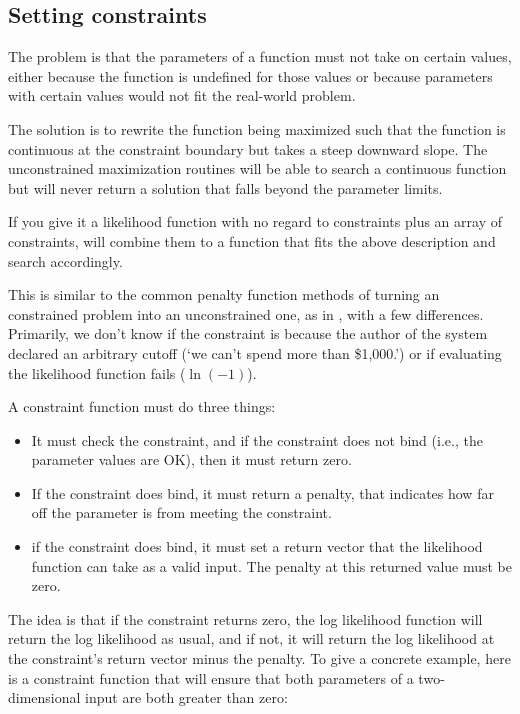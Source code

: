 \subsection{Setting constraints}

The problem is that the parameters of a function must not take on
certain values, either because the function is undefined for those
values or because parameters with certain values would not fit the
real-world problem.

The solution is to rewrite the function being maximized such that the
function is continuous at the constraint boundary but takes a steep
downward slope. The unconstrained maximization routines will be able
to search a continuous function but will never return a solution that
falls beyond the parameter limits.

If you give it a likelihood function with no regard to constraints plus
an array of constraints,  will combine
them to a function that fits the above description and search accordingly.

This is similar to the common penalty function methods of turning an
constrained problem into an unconstrained one, as in \cite{avriel:nonlinear},
with a few differences. Primarily, we don't know if the constraint is
because the author of the system declared an arbitrary cutoff (`we can't spend more
than \$1,000.') or if evaluating the likelihood function fails
($\ln(-1)$). 

A constraint function must do three things:
\begin{itemize}
\item It must check the constraint, and if the constraint does not bind (i.e., the parameter values are OK), then it must return zero.
\item If the constraint does bind, it must return a penalty, that indicates how far off the parameter is from meeting the constraint.
\item if the constraint does bind, it must set a return vector that the likelihood function can take as a valid input. The penalty at this returned value must be zero.
\end{itemize}

The idea is that if the constraint returns zero, the log likelihood
function will return the log likelihood as usual, and if not, it will
return the log likelihood at the constraint's return vector minus the
penalty. To give a concrete example, here is a constraint function that
will ensure that both parameters of a two-dimensional input are both
greater than zero:

